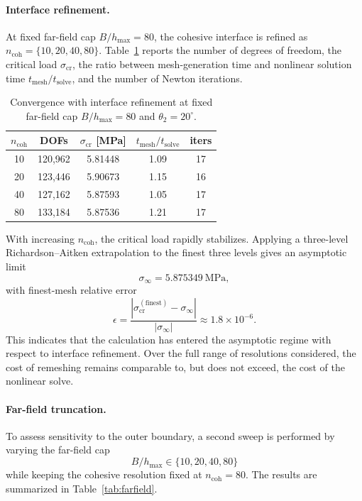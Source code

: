 \documentclass[smallextended]{svjour3}       %
\begin{document}
\paragraph{Interface refinement.}
At fixed far-field cap \(B/h_{\max}=80\), the cohesive interface is refined
as \(n_{\mathrm{coh}}=\{10,20,40,80\}\). Table~\ref{tab:refine}
reports the number of degrees of freedom, the critical load
\(\sigma_{\mathrm{cr}}\), the ratio between mesh-generation time and
nonlinear solution time \(t_{\mathrm{mesh}}/t_{\mathrm{solve}}\), and the
number of Newton iterations.

\begin{table}[h!]
	\centering
	\caption{Convergence with interface refinement at fixed far-field cap
		\(B/h_{\max}=80\) and \(\theta_2=20^\circ\).}
	\label{tab:refine}
	\begin{tabular}{ccccc}
		\hline
		\(n_{\mathrm{coh}}\) & DOFs & \(\sigma_{\mathrm{cr}}\) [MPa] &
		\(t_{\mathrm{mesh}}/t_{\mathrm{solve}}\) & iters\\
		\hline
		10 & 120,962 & 5.81448 & 1.09 & 17\\
		20 & 123,446 & 5.90673 & 1.15 & 16\\
		40 & 127,162 & 5.87593 & 1.05 & 17\\
		80 & 133,184 & 5.87536 & 1.21 & 17\\
		\hline
	\end{tabular}
\end{table}

With increasing \(n_{\mathrm{coh}}\), the critical load rapidly stabilizes.
Applying a three-level Richardson--Aitken extrapolation to the finest three
levels gives an asymptotic limit
\[
\sigma_\infty=5.875349~\mathrm{MPa},
\]
with finest-mesh relative error
\[
\epsilon=
\frac{|\sigma_{\mathrm{cr}}^{(\mathrm{finest})}-\sigma_\infty|}
{|\sigma_\infty|}
\approx 1.8\times10^{-6}.
\]
This indicates that the calculation has entered the asymptotic regime with
respect to interface refinement. Over the full range of resolutions
considered, the cost of remeshing remains comparable to, but does not
exceed, the cost of the nonlinear solve.

\paragraph{Far-field truncation.}
To assess sensitivity to the outer boundary, a second sweep is performed by
varying the far-field cap
\[
B/h_{\max}\in\{10,20,40,80\}
\]
while keeping the cohesive resolution fixed at \(n_{\mathrm{coh}}=80\).
The results are summarized in Table~\ref{tab:farfield}.
\end{document}
